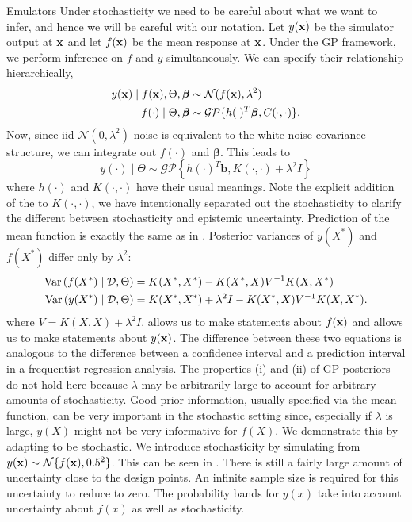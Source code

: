 \begin{chapter}{Emulators \label{Ch:Emulators}}
Under stochasticity we need to be careful about what we want to infer, and hence we will be careful with our notation. Let $y(\mathbf{x})$ be the simulator output at $\mathbf{x}$ and let $f(\mathbf{x})$ be the mean response at $\mathbf{x}$. Under the GP framework, we perform inference on $f$ and $y$ simultaneously. We can specify their relationship hierarchically,
\begin{align}
  y(\mathbf{x}) \mid f(\mathbf{x}), \Theta, \bm{\beta} &\sim \mathcal{N}(f(\mathbf{x}), \lambda^2) \label{Eq:homgp1} \\
  f(\cdot)  \mid \Theta, \bm{\beta} &\sim \mathcal{GP} \{ h(\cdot)^T \bm{\beta}, C(\cdot, \cdot) \}.\label{Eq:homgp2}
\end{align}
Now, since iid $\mathcal{N}(0, \lambda^2)$ noise is equivalent to the white noise covariance structure, we can integrate out $f(\cdot)$ and $\bm{\beta}$. This leads to
\begin{equation}
  y(\cdot) \mid \Theta \sim \mathcal{GP}\left\{ h(\cdot)^T\bm{b}, K(\cdot, \cdot) + \lambda^2 I \right\}
\end{equation}
where $h(\cdot)$ and $K(\cdot, \cdot)$ have their usual meanings. Note the explicit addition of the  to $K(\cdot, \cdot)$, we have intentionally separated out the stochasticity to clarify the different between stochasticity and epistemic uncertainty. Prediction of the mean function is exactly the same as in . Posterior variances of $y(X^*)$ and $f(X^*)$ differ only by $\lambda^2$:
\begin{align}
  \mathrm{Var}\,(f(X^*) \mid \mathcal{D}, \Theta) &= K(X^*, X^*) - K(X^*, X) V^{-1} K(X, X^*)\label{Eq:varf} \\
  \mathrm{Var}\,( y(X^*) \mid \mathcal{D}, \Theta) &= K(X^*, X^*)  + \lambda^2 I - K(X^*, X) V^{-1} K(X, X^*).\label{Eq:vary}
\end{align}
where $V = K(X, X) + \lambda^2 I$.  allows us to make statements about $f(\mathbf{x})$ and  allows us to make statements about $y(\mathbf{x})$. The difference between these two equations is analogous to the difference between a confidence interval and a prediction interval in a frequentist regression analysis.
The properties (i) and (ii) of GP posteriors do not hold here because $\lambda$ may be arbitrarily large to account for arbitrary amounts of stochasticity. Good prior information, usually specified via the mean function, can be very important in the stochastic setting since, especially if $\lambda$ is large, $y(X)$ might not be very informative for $f(X)$. We demonstrate this by adapting  to be stochastic. We introduce stochasticity by simulating from $y(\mathbf{x}) \sim \mathcal{N} \{f(\mathbf{x}), 0.5^2 \}$. This can be seen in . There is still a fairly large amount of uncertainty close to the design points. An infinite sample size is required for this uncertainty to reduce to zero. The probability bands for $y(x)$ take into account uncertainty about $f(x)$ as well as stochasticity.

\end{chapter}
